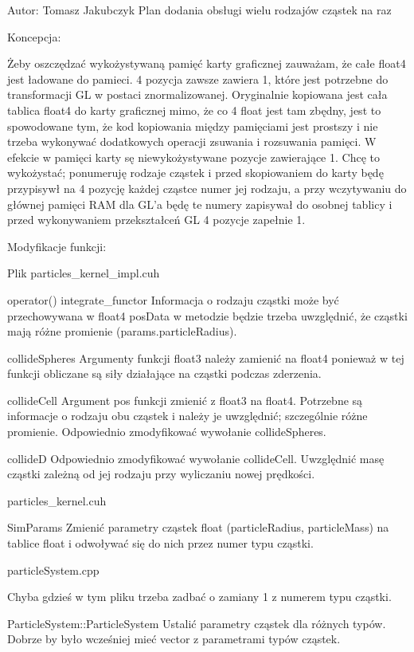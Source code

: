 \begin{DoxyVerbInclude}
	Autor: Tomasz Jakubczyk
Plan dodania obsługi wielu rodzajów cząstek na raz


	Koncepcja:

Żeby oszczędzać wykożystywaną pamięć karty graficznej zauważam, że całe float4 jest ładowane do pamieci.
4 pozycja zawsze zawiera 1, które jest potrzebne do transformacji GL w postaci znormalizowanej.
Oryginalnie kopiowana jest cała tablica float4 do karty graficznej mimo, że co 4 float jest tam zbędny,
jest to spowodowane tym, że kod kopiowania między pamięciami jest prostszy i nie trzeba wykonywać dodatkowych
operacji zsuwania i rozsuwania pamięci.
W efekcie w pamięci karty sę niewykożystywane pozycje zawierające 1.
Chcę to wykożystać;
ponumeruję rodzaje cząstek i przed skopiowaniem do karty będę przypisywł na 4 pozycję każdej cząstce
numer jej rodzaju, a przy wczytywaniu do głównej pamięci RAM dla GL'a będę te numery zapisywał
do osobnej tablicy i przed wykonywaniem przekształceń GL 4 pozycje zapełnie 1.


	Modyfikacje funkcji:

Plik particles_kernel_impl.cuh

operator() integrate_functor
Informacja o rodzaju cząstki może być przechowywana w float4 posData
w metodzie będzie trzeba uwzględnić, że cząstki mają różne promienie (params.particleRadius).

collideSpheres
Argumenty funkcji float3 należy zamienić na float4 ponieważ w tej funkcji obliczane są siły działające
na cząstki podczas zderzenia.

collideCell
Argument pos funkcji zmienić z float3 na float4.
Potrzebne są informacje o rodzaju obu cząstek i należy je uwzględnić; szczególnie różne promienie.
Odpowiednio zmodyfikować wywołanie collideSpheres.

collideD
Odpowiednio zmodyfikować wywołanie collideCell.
Uwzględnić masę cząstki zależną od jej rodzaju przy wyliczaniu nowej prędkości.

particles_kernel.cuh

SimParams
Zmienić parametry cząstek float (particleRadius, particleMass) na tablice float i odwoływać się do nich
przez numer typu cząstki.

particleSystem.cpp

Chyba gdzieś w tym pliku trzeba zadbać o zamiany 1 z numerem typu cząstki.

ParticleSystem::ParticleSystem
Ustalić parametry cząstek dla różnych typów.
Dobrze by było wcześniej mieć vector z parametrami typów cząstek.


\end{DoxyVerbInclude}
